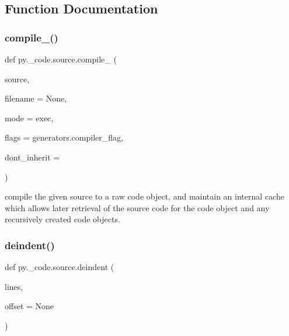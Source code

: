 \subsection{Function Documentation}
\mbox{\label{namespacepy_1_1__code_1_1source_af3f5dcbd3ee701b6ecc866bd59a61f02}} 
\subsubsection{\texorpdfstring{compile\+\_\+()}{compile\_()}}
{\footnotesize\ttfamily def py.\+\_\+code.\+source.\+compile\+\_\+ (\begin{DoxyParamCaption}\item[{}]{source,  }\item[{}]{filename = {\ttfamily None},  }\item[{}]{mode = {\ttfamily \textquotesingle{}exec\textquotesingle{}},  }\item[{}]{flags = {\ttfamily generators.compiler\+\_\+flag},  }\item[{}]{dont\+\_\+inherit = {} }\end{DoxyParamCaption})}

\begin{DoxyVerb}compile the given source to a raw code object,
    and maintain an internal cache which allows later
    retrieval of the source code for the code object
    and any recursively created code objects.
\end{DoxyVerb}
 \mbox{\label{namespacepy_1_1__code_1_1source_ac2f9860641c07be3e9f445e0e79977ee}} 
\subsubsection{\texorpdfstring{deindent()}{deindent()}}
{\footnotesize\ttfamily def py.\+\_\+code.\+source.\+deindent (\begin{DoxyParamCaption}\item[{}]{lines,  }\item[{}]{offset = {\ttfamily None} }\end{DoxyParamCaption})}

